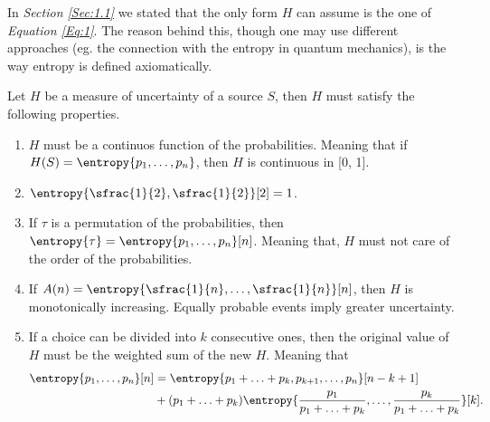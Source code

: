 \documentclass{subfiles}
\begin{document}
    In \emph{Section \ref{Sec:1.1}} we stated that the only form \(H\) can 
    assume is the one of \emph{Equation \eqref{Eq:1}}. 
    The reason behind this, though one may use different approaches 
        (eg. the connection with the entropy in quantum mechanics), 
        is the way entropy is defined axiomatically. 

    \begin{axiom*}
        Let \(H\) be a measure of uncertainty of a source \(S\), 
            then \(H\) must satisfy the following properties.
        \begin{enumerate}
            \item \(H\) must be a continuos function of the probabilities.
                Meaning that if \(H(S) = \entropy{p_{1}, \ldots, p_{n}}\), 
                then \(H\) is continuous in [0, 1].

            \item \(\entropy{\sfrac{1}{2}, \sfrac{1}{2}}[2] = 1\).

            \item If \(\tau\) is a permutation of the probabilities, 
                then \(\entropy{\tau} = \entropy{p_{1}, \ldots, p_{n}}[n]\). 
                Meaning that, \(H\) must not care of the order of the probabilities.

            \item If \(A(n) = \entropy{\sfrac{1}{n}, \ldots, \sfrac{1}{n}}[n]\),
                then \(H\) is monotonically increasing.
                Equally probable events imply greater uncertainty.

            \item If a choice can be divided into \(k\) consecutive ones,
                then the original value of \(H\) must be the weighted sum of the new \(H\).
                Meaning that
                \[\begin{aligned}
                    \entropy{p_{1}, \ldots, p_{n}}[n] & = 
                        \entropy{
                            p_{1} + \ldots + p_{k}, p_{k + 1}, \ldots, p_{n}
                        }[n - k + 1] \\ 
                        & + (p_{1} + \ldots + p_{k})
                            \entropy{
                                \frac{p_{1}}{p_{1} + \ldots + p_{k}},
                                \ldots,
                                \frac{p_{k}}{p_{1} + \ldots + p_{k}}
                            }[k].
                \end{aligned}\]
       \end{enumerate}
    \end{axiom*} 
\end{document}
